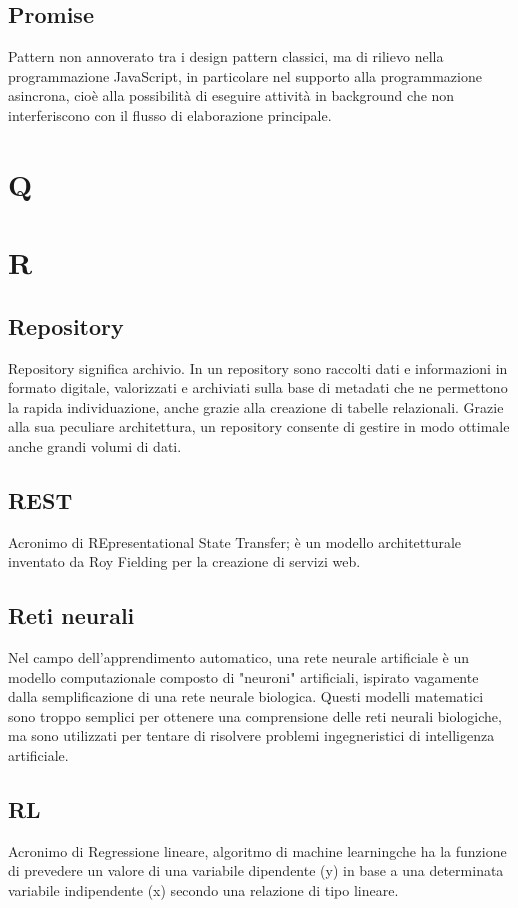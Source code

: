 \subsection*{Promise}
Pattern non annoverato tra i design pattern classici, ma di rilievo nella programmazione JavaScript, in particolare nel supporto alla programmazione asincrona, cioè alla possibilità di eseguire attività in background che non interferiscono con il flusso di elaborazione principale.

\clearpage
\section*{Q}

\clearpage
\section*{R}

\subsection*{Repository}
Repository significa archivio. In un repository sono raccolti dati e informazioni in formato digitale, valorizzati e archiviati sulla base di metadati che ne permettono la rapida individuazione, anche grazie alla creazione di tabelle relazionali. Grazie alla sua peculiare architettura, un repository consente di gestire in modo ottimale anche grandi volumi di dati.

\subsection*{REST}
Acronimo di REpresentational State Transfer; è un modello architetturale inventato da Roy Fielding per la creazione di servizi web.

\subsection*{Reti neurali}
Nel campo dell'apprendimento automatico, una rete neurale artificiale  è un modello computazionale composto di "neuroni" artificiali, ispirato vagamente dalla semplificazione di una rete neurale biologica. Questi modelli matematici sono troppo semplici per ottenere una comprensione delle reti neurali biologiche, ma sono utilizzati per tentare di risolvere problemi ingegneristici di intelligenza artificiale.

\subsection*{RL}
Acronimo di Regressione lineare, algoritmo di machine learning\glosp che ha la funzione di prevedere un valore di una variabile dipendente (y) in base a una determinata variabile indipendente (x) secondo una relazione di tipo lineare.

